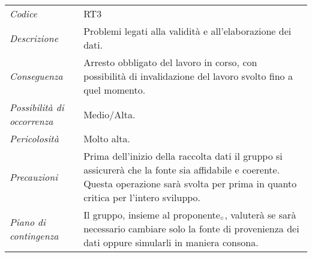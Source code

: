 {{{	\begin{center}
		\renewcommand{\arraystretch}{1.4}
		\begin{longtable}{|p{5cm}|p{12cm}|}
			\hline
			\rowcolor{airforceblue}
			\multicolumn{2}{|c|}{\textit{Validità dei dati}}\\
			\hline
			\textit{Codice} & RT3 \\
			\hline
			\textit{Descrizione} & Problemi legati alla validità e all'elaborazione dei dati. \\
			\hline
			\textit{Conseguenza} & Arresto obbligato del lavoro in corso, con possibilità di invalidazione del lavoro svolto fino a quel momento. \\
			\hline
			\textit{Possibilità di occorrenza} & Medio/Alta. \\
			\hline
			\textit{Pericolosità} & Molto alta. \\
			\hline
			\textit{Precauzioni} & Prima dell'inizio della raccolta dati il gruppo si assicurerà che la fonte sia affidabile e coerente.
			Questa operazione sarà svolta per prima in quanto critica per l'intero sviluppo.  \\
			\hline
			\textit{Piano di contingenza} & Il gruppo, insieme al proponente$_{\scaleto{G}{3pt}}$, valuterà se sarà necessario cambiare solo la fonte di provenienza dei dati oppure simularli in maniera consona. \\
			\hline
		\end{longtable}
	\end{center}

\def\tabularxcolumn#1{m{#1}}
{
	
}}}}

